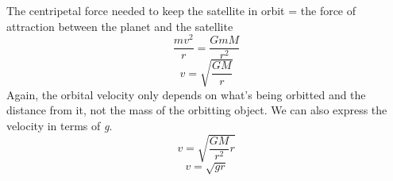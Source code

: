 \documentclass[9pt]{article}
\begin{document}
	The centripetal force needed to keep the satellite in orbit = the force of attraction between the planet and the satellite \\ 
	
	$$\dfrac{mv^2}{r}=\dfrac{GmM}{r^2}$$
	$$v=\sqrt{\dfrac{GM}{r}}$$
	Again, the orbital velocity only depends on what's being orbitted and the distance from it, not the mass of the orbitting object.
	We can also express the velocity in terms of \textit{g}.
	$$v=\sqrt{\dfrac{GM}{r^2}r}$$
	$$v=\sqrt{gr}$$
	
	
\end{document}
